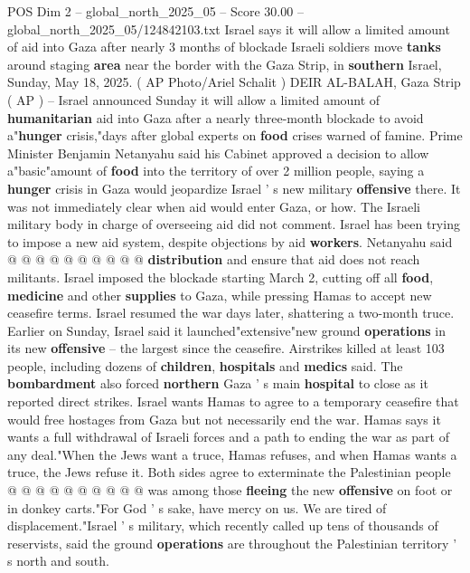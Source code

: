 \begin{textsample}{POS Dim 2 – global\_north\_2025\_05 – Score 30.00 – global\_north\_2025\_05/124842103.txt}  \label{ex:f2_pos_213}
Israel says it will allow a limited amount of aid into Gaza after nearly 3 months of blockade Israeli soldiers move \textbf{tanks} around staging \textbf{area} near the border with the Gaza Strip, in \textbf{southern} Israel, Sunday, May 18, 2025. ( AP Photo/Ariel Schalit ) DEIR AL-BALAH, Gaza Strip ( AP ) -- Israel announced Sunday it will allow a limited amount of \textbf{humanitarian} aid into Gaza after a nearly three-month blockade to avoid a"\textbf{hunger} crisis,"days after global experts on \textbf{food} crises warned of famine.
Prime Minister Benjamin Netanyahu said his Cabinet approved a decision to allow a"basic"amount of \textbf{food} into the territory of over 2 million people, saying a \textbf{hunger} crisis in Gaza would jeopardize Israel ' s new military \textbf{offensive} there.
It was not immediately clear when aid would enter Gaza, or how.
The Israeli military body in charge of overseeing aid did not comment.
Israel has been trying to impose a new aid system, despite objections by aid \textbf{workers}.
Netanyahu said @ @ @ @ @ @ @ @ @ @ \textbf{distribution} and ensure that aid does not reach militants.
Israel imposed the blockade starting March 2, cutting off all \textbf{food}, \textbf{medicine} and other \textbf{supplies} to Gaza, while pressing Hamas to accept new ceasefire terms.
Israel resumed the war days later, shattering a two-month truce.
Earlier on Sunday, Israel said it launched"extensive"new ground \textbf{operations} in its new \textbf{offensive} -- the largest since the ceasefire.
Airstrikes killed at least 103 people, including dozens of \textbf{children}, \textbf{hospitals} and \textbf{medics} said.
The \textbf{bombardment} also forced \textbf{northern} Gaza ' s main \textbf{hospital} to close as it reported direct strikes.
Israel wants Hamas to agree to a temporary ceasefire that would free hostages from Gaza but not necessarily end the war.
Hamas says it wants a full withdrawal of Israeli forces and a path to ending the war as part of any deal."When the Jews want a truce, Hamas refuses, and when Hamas wants a truce, the Jews refuse it.
Both sides agree to exterminate the Palestinian people @ @ @ @ @ @ @ @ @ @ was among those \textbf{fleeing} the new \textbf{offensive} on foot or in donkey carts."For God ' s sake, have mercy on us.
We are tired of displacement."Israel ' s military, which recently called up tens of thousands of reservists, said the ground \textbf{operations} are throughout the Palestinian territory ' s north and south.

\end{textsample}
